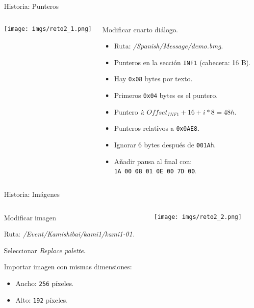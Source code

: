 \begin{frame}{Historia: Punteros}
    \begin{columns}
    \begin{column}{0.3\textwidth}
        \texttt{[image: imgs/reto2\_1.png]}
    \end{column}
    \begin{column}{0.7\textwidth}
        Modificar cuarto diálogo.
        \footnotesize
        \begin{itemize}
            \item Ruta: \textit{/Spanish/Message/demo.bmg}.
            \item Punteros en la sección \texttt{INF1} (cabecera: 16 B).
            \item Hay \texttt{0x08} bytes por texto.
            \item Primeros \texttt{0x04} bytes es el puntero.
            \item Puntero \textit{i}: $Offset_{INF1} + 16 + i*8=48h$.
            \item Punteros relativos a \texttt{0x0AE8}.
            \item Ignorar 6 bytes después de \texttt{001Ah}.
            \item Añadir pausa al final con: \\
                  \texttt{1A 00 08 01 0E 00 7D 00}.
        \end{itemize}
    \end{column}
    \end{columns}
\end{frame}

\begin{frame}{Historia: Imágenes}
    \begin{columns}
    \begin{column}{0.7\textwidth}
        Modificar imagen
        \footnotesize
        \begin{wideitemize}
            \item Ruta: \textit{/Event/Kamishibai/kami1/kami1-01}.
            \item Seleccionar \textit{Replace palette}.
            \item Importar imagen con mismas dimensiones:
            \begin{itemize}
                \item Ancho: \texttt{256} píxeles.
                \item Alto: \texttt{192} píxeles.
            \end{itemize}
        \end{wideitemize}
    \end{column}
    \begin{column}{0.3\textwidth}
        \texttt{[image: imgs/reto2\_2.png]}
    \end{column}
    \end{columns}
\end{frame}

